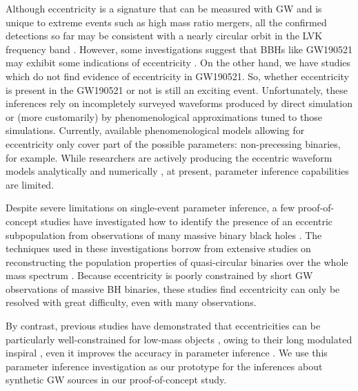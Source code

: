 \documentclass[twocolumn,prd,nofootinbib]{revtex4}
\begin{document}
Although eccentricity is a signature that can be measured with GW and is unique to extreme events such as 
high mass ratio mergers, all the confirmed detections so far may be consistent with a nearly circular orbit
in the LVK frequency band \cite{Isobel-2022,hector-jake-2022}. However, some investigations suggest that 
BBHs like GW190521 may exhibit some indications of eccentricity 
\cite{Gamba_2022_GW190521_dynamical,yumeng-2023, 2023NatAs...7...11G, 2020arXiv200905461G,2020ApJ...903L...5R}.
On the other hand, we have studies \cite{2022arXiv220801766I,2023PhRvD.108l4063R}which do not find evidence of eccentricity in GW190521. So, whether eccentricity is present in the GW190521 or not is still an exciting event.
Unfortunately, these inferences rely on incompletely surveyed waveforms produced by direct simulation or (more customarily) by phenomenological approximations tuned to those simulations. Currently, available phenomenological models allowing for eccentricity only cover part of the possible parameters: non-precessing
binaries, for example. 
While researchers are actively producing the eccentric waveform models analytically \cite{Huerta-2014} and 
numerically \cite{gold-2016,hinder-2010, Healy-2022, Alessandro-2022, Campanelli-2009}, at present, parameter
inference capabilities are limited. 

Despite severe limitations on single-event parameter inference, a few proof-of-concept studies have 
investigated how to identify the presence of an eccentric subpopulation from observations of many massive
binary black holes \cite{lower-2018-ecc-pop, Fang-2019,wu-2020}.
The techniques used in these investigations borrow from extensive studies on reconstructing the population 
properties of quasi-circular binaries over the whole mass spectrum
\cite{Dan_2019, Michael-2015, samsing-hamers-2019, 
belczynski-2016, Colm-2017, Akinobu-2017, farr-2017-nature, Richard-2017-natal-kicks, 
Dan-Richard-2018, Abbot-2019-pop, 2021ApJ...921L..43Z}.
Because eccentricity is poorly constrained by short GW observations of massive BH binaries, these studies
find eccentricity can only be resolved with great difficulty, even with many observations.

By contrast, previous studies have demonstrated that eccentricities can be particularly
well-constrained for low-mass objects \cite{kate2024}, owing to their long modulated inspiral \cite{favata-scaling-2022},
even it improves the accuracy in parameter inference \cite{2015PhRvD..92d4034S}. We use this parameter inference investigation as our prototype for the inferences about synthetic
GW sources in our proof-of-concept study.
\end{document}
